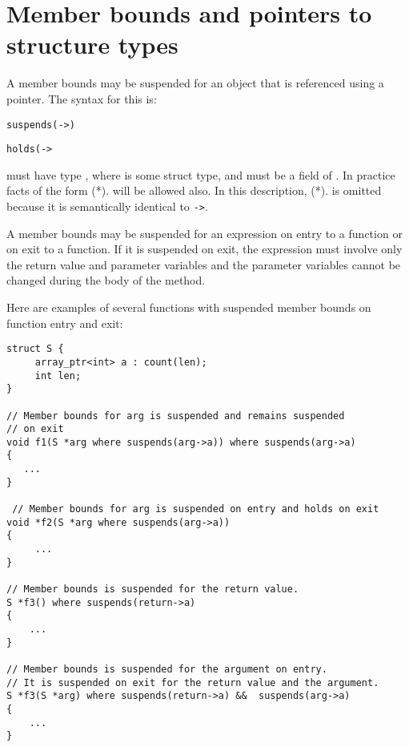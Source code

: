 
\chapter{Member bounds and pointers to structure types}\label{member-bounds-and-pointers-to-structure-types}

A member bounds may be suspended for an object that is referenced using
a pointer. The syntax for this is:


\texttt{suspends(}\texttt{-\textgreater{}}\texttt{)}

\texttt{holds(}\texttt{-\textgreater{}}

 must have type , where
 is some struct type, and  must be a field of
. In practice facts of the form (*).
will be allowed also. In this description,
(*). is omitted because it is semantically
identical to \texttt{-\textgreater{}}.

A member bounds may be suspended for an expression on entry to a
function or on exit to a function. If it is suspended on exit, the
expression must involve only the return value and parameter variables
and the parameter variables cannot be changed during the body of the
method.

Here are examples of several functions with suspended member bounds on
function entry and exit:

\begin{verbatim}
struct S {
     array_ptr<int> a : count(len);
     int len;
}

// Member bounds for arg is suspended and remains suspended
// on exit
void f1(S *arg where suspends(arg->a)) where suspends(arg->a)
{
   ...
}

 // Member bounds for arg is suspended on entry and holds on exit
void *f2(S *arg where suspends(arg->a))
{ 
     ...
}

// Member bounds is suspended for the return value.
S *f3() where suspends(return->a)
{
    ...
}

// Member bounds is suspended for the argument on entry.
// It is suspended on exit for the return value and the argument.
S *f3(S *arg) where suspends(return->a) &&  suspends(arg->a)
{
    ...
}
\end{verbatim}

